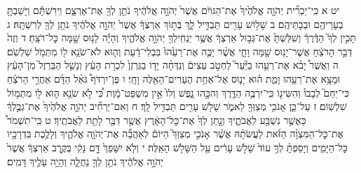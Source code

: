 \documentclass[twoside, openany, parskip=half, 11pt]{book}
\begin{document}
יט א כִּֽי־יַכְרִ֞ית יְהֹוָ֤ה אֱלֹהֶ֙יךָ֙ אֶת־הַגּוֹיִ֔ם אֲשֶׁר֙ יְהֹוָ֣ה אֱלֹהֶ֔יךָ נֹתֵ֥ן לְךָ֖ אֶת־אַרְצָ֑ם וִֽירִשְׁתָּ֕ם וְיָשַׁבְתָּ֥ בְעָרֵיהֶ֖ם וּבְבָתֵּיהֶֽם׃ ב שָׁל֥וֹשׁ עָרִ֖ים תַּבְדִּ֣יל לָ֑ךְ בְּת֣וֹךְ אַרְצְךָ֔ אֲשֶׁר֙ יְהֹוָ֣ה אֱלֹהֶ֔יךָ נֹתֵ֥ן לְךָ֖ לְרִשְׁתָּֽהּ׃ ג תָּכִ֣ין לְךָ֮ הַדֶּ֒רֶךְ֒ וְשִׁלַּשְׁתָּ֙ אֶת־גְּב֣וּל אַרְצְךָ֔ אֲשֶׁ֥ר יַנְחִֽילְךָ֖ יְהֹוָ֣ה אֱלֹהֶ֑יךָ וְהָיָ֕ה לָנ֥וּס שָׁ֖מָּה כׇּל־רֹצֵֽחַ׃ ד וְזֶה֙ דְּבַ֣ר הָרֹצֵ֔חַ אֲשֶׁר־יָנ֥וּס שָׁ֖מָּה וָחָ֑י אֲשֶׁ֨ר יַכֶּ֤ה אֶת־רֵעֵ֙הוּ֙ בִּבְלִי־דַ֔עַת וְה֛וּא לֹא־שֹׂנֵ֥א ל֖וֹ מִתְּמֹ֥ל שִׁלְשֹֽׁם׃ ה וַאֲשֶׁר֩ יָבֹ֨א אֶת־רֵעֵ֥הוּ בַיַּ֘עַר֮ לַחְטֹ֣ב עֵצִים֒ וְנִדְּחָ֨ה יָד֤וֹ בַגַּרְזֶן֙ לִכְרֹ֣ת הָעֵ֔ץ וְנָשַׁ֤ל הַבַּרְזֶל֙ מִן־הָעֵ֔ץ וּמָצָ֥א אֶת־רֵעֵ֖הוּ וָמֵ֑ת ה֗וּא יָנ֛וּס אֶל־אַחַ֥ת הֶעָרִים־הָאֵ֖לֶּה וָחָֽי׃ ו פֶּן־יִרְדֹּף֩ גֹּאֵ֨ל הַדָּ֜ם אַחֲרֵ֣י הָרֹצֵ֗חַ כִּי־יֵחַם֮ לְבָבוֹ֒ וְהִשִּׂיג֛וֹ כִּֽי־יִרְבֶּ֥ה הַדֶּ֖רֶךְ וְהִכָּ֣הוּ נָ֑פֶשׁ וְלוֹ֙ אֵ֣ין מִשְׁפַּט־מָ֔וֶת כִּ֠י לֹ֣א שֹׂנֵ֥א ה֛וּא ל֖וֹ מִתְּמ֥וֹל שִׁלְשֽׁוֹם׃ ז עַל־כֵּ֛ן אָנֹכִ֥י מְצַוְּךָ֖ לֵאמֹ֑ר שָׁלֹ֥שׁ עָרִ֖ים תַּבְדִּ֥יל לָֽךְ׃ ח וְאִם־יַרְחִ֞יב יְהֹוָ֤ה אֱלֹהֶ֙יךָ֙ אֶת־גְּבֻ֣לְךָ֔ כַּאֲשֶׁ֥ר נִשְׁבַּ֖ע לַאֲבֹתֶ֑יךָ וְנָ֤תַן לְךָ֙ אֶת־כׇּל־הָאָ֔רֶץ אֲשֶׁ֥ר דִּבֶּ֖ר לָתֵ֥ת לַאֲבֹתֶֽיךָ׃ ט כִּֽי־תִשְׁמֹר֩ אֶת־כׇּל־הַמִּצְוָ֨ה הַזֹּ֜את לַעֲשֹׂתָ֗הּ אֲשֶׁ֨ר אָנֹכִ֣י מְצַוְּךָ֮ הַיּוֹם֒ לְאַהֲבָ֞ה אֶת־יְהֹוָ֧ה אֱלֹהֶ֛יךָ וְלָלֶ֥כֶת בִּדְרָכָ֖יו כׇּל־הַיָּמִ֑ים וְיָסַפְתָּ֨ לְךָ֥ עוֹד֙ שָׁלֹ֣שׁ עָרִ֔ים עַ֖ל הַשָּׁלֹ֥שׁ הָאֵֽלֶּה׃ י וְלֹ֤א יִשָּׁפֵךְ֙ דָּ֣ם נָקִ֔י בְּקֶ֣רֶב אַרְצְךָ֔ אֲשֶׁר֙ יְהֹוָ֣ה אֱלֹהֶ֔יךָ נֹתֵ֥ן לְךָ֖ נַחֲלָ֑ה וְהָיָ֥ה עָלֶ֖יךָ דָּמִֽים׃
\end{document}
